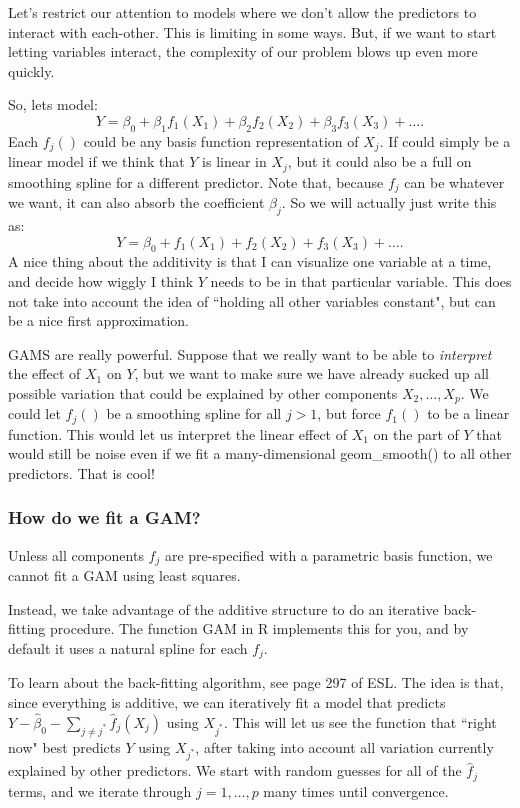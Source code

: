 Let's restrict our attention to models where we don't allow the predictors to interact with each-other. This is limiting in some ways. But, if we want to start letting variables interact, the complexity of our problem blows up even more quickly. 

So, lets model:
$$
Y = \beta_0 + \beta_1 f_1 (X_1) + \beta_2 f_2 (X_2) + \beta_3 f_3 (X_3) + \ldots.  
$$
Each $f_j()$ could be any basis function representation of $X_j$. If could simply be a linear model if we think that $Y$ is linear in $X_j$, but it could also be a full on smoothing spline for a different predictor. Note that, because $f_j$ can be whatever we want, it can also absorb the coefficient $\beta_j$. So we will actually just write this as: 
$$
Y = \beta_0 + f_1 (X_1) + f_2 (X_2) + f_3 (X_3) + \ldots.  
$$
A nice thing about the additivity is that I can visualize one variable at a time, and decide how wiggly I think $Y$ needs to be in that particular variable. This does not take into account the idea of ``holding all other variables constant", but can be a nice first approximation. 

GAMS are really powerful. Suppose that we really want to be able to \emph{interpret} the effect of $X_1$ on $Y$, but we want to make sure we have already sucked up all possible variation that could be explained by other components $X_2,\ldots,X_p$. We could let $f_j()$ be a smoothing spline for all $j > 1$, but force $f_1()$ to be a linear function. This would let us interpret the linear effect of $X_1$ on the part of $Y$ that would still be noise even if we fit a many-dimensional geom\_smooth() to all other predictors. That is cool! 

\subsubsection{How do we fit a GAM?}

Unless all components $f_j$ are pre-specified with a parametric basis function, we cannot fit a GAM using least squares.

Instead, we take advantage of the additive structure to do an iterative back-fitting procedure. The function GAM in R implements this for you, and by default it uses a natural spline for each $f_j$. 

To learn about the back-fitting algorithm, see page 297 of ESL. The idea is that, since everything is additive, we can iteratively fit a model that predicts 
$
Y - \hat{\beta}_0 - \sum_{j \neq j^*} \hat{f}_j(X_j) 
$ using $X_{j^*}$. This will let us see the function that ``right now" best predicts $Y$ using  $X_{j^*}$, after taking into account all variation currently explained by other predictors. We start with random guesses for all of the $\hat{f}_j$ terms, and we iterate through $j=1,\ldots,p$ many times until convergence. 

